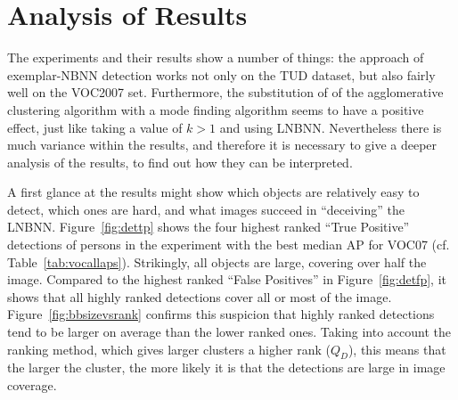 \section{Analysis of Results} %
\label{cha:analysis_of_results}

The experiments and their results show a number of things: the approach of exemplar-NBNN detection works not only on the TUD dataset, but also fairly well on the VOC2007 set. Furthermore, the substitution of of the agglomerative clustering algorithm with a mode finding algorithm seems to have a positive effect, just like taking a value of $k>1$ and using LNBNN. Nevertheless there is much variance within the results, and therefore it is necessary to give a deeper analysis of the results, to find out how they can be interpreted.

A first glance at the results might show which objects are relatively easy to detect, which ones are hard, and what images succeed in ``deceiving'' the LNBNN. Figure~\ref{fig:dettp} shows the four highest ranked ``True Positive'' detections of persons in the experiment with the best median AP for VOC07 (cf. Table~\ref{tab:vocallaps}). Strikingly, all objects are large, covering over half the image. Compared to the highest ranked ``False Positives'' in Figure~\ref{fig:detfp}, it shows that all highly ranked detections cover all or most of the image. Figure~\ref{fig:bbsizevsrank} confirms this suspicion that highly ranked detections tend to be larger on average than the lower ranked ones. Taking into account the ranking method, which gives larger clusters a higher rank ($Q_D$), this means that the larger the cluster, the more likely it is that the detections are large in image coverage.

